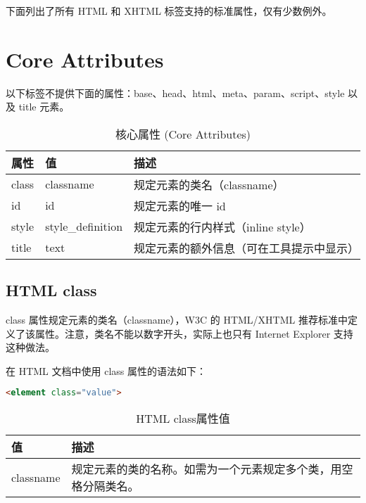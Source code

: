 

下面列出了所有 HTML 和 XHTML 标签支持的标准属性，仅有少数例外。

\section{Core Attributes}



以下标签不提供下面的属性：base、head、html、meta、param、script、style 以及 title 元素。

\begin{table}[!h]
\centering
\caption{核心属性 (Core Attributes)}
\begin{tabular}{|l|l|l|}
\hline
属性		&值			&描述\\
\hline
class	&classname	&规定元素的类名（classname）\\
\hline
id		&id			&规定元素的唯一 id\\
\hline
style	&style\_definition&	规定元素的行内样式（inline style）\\
\hline
title		&text		&规定元素的额外信息（可在工具提示中显示）\\
\hline
\end{tabular}
\end{table}

\clearpage

\subsection{HTML class}

class 属性规定元素的类名（classname），W3C 的 HTML/XHTML 推荐标准中定义了该属性。注意，类名不能以数字开头，实际上也只有 Internet Explorer 支持这种做法。

在 HTML 文档中使用 class 属性的语法如下：

\begin{lstlisting}[language=HTML]
<element class="value">
\end{lstlisting}

\vspace{-15pt}

\begin{table}[!h]
\centering
\vspace{-10pt}
\caption{HTML class属性值}
\label{html_class_attribute}
\begin{tabular}{|m{40pt}|m{330pt}|}
\hline
值	&描述\\
\hline
classname	&规定元素的类的名称。如需为一个元素规定多个类，用空格分隔类名。\\
\hline
\end{tabular}
\end{table}

